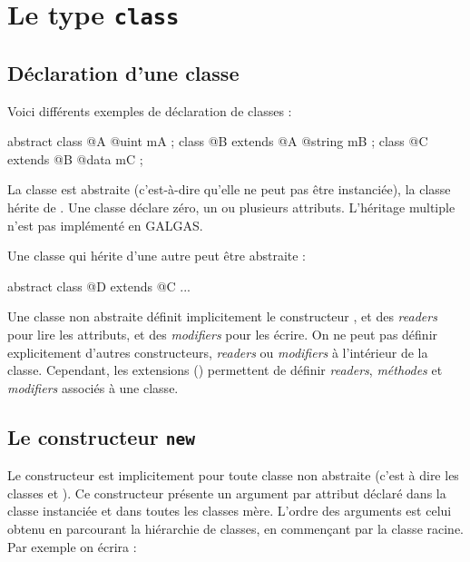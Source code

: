 
\chapter{Le type \texttt{class}}

\section{Déclaration d'une classe}

Voici différents exemples de déclaration de classes :

\begin{galgascode}
abstract class @A {
  @uint mA ;
}
class @B extends @A {
  @string mB ;
}
class @C extends @B {
  @data mC ;
}
\end{galgascode}

La classe  est abstraite (c'est-à-dire qu'elle ne peut pas être instanciée), la classe  hérite de . Une classe déclare zéro, un ou plusieurs attributs. L'héritage multiple n'est pas implémenté en GALGAS.

Une classe qui hérite d'une autre peut être abstraite :
\begin{galgascode}
abstract class @D extends @C {
  ...
 }
\end{galgascode}

Une classe non abstraite définit implicitement le constructeur , et des \emph{readers} pour lire les attributs, et des \emph{modifiers} pour les écrire. On ne peut pas définir explicitement d'autres constructeurs, \emph{readers} ou \emph{modifiers} à l'intérieur de la classe. Cependant,  les extensions () permettent de définir \emph{readers}, \emph{méthodes} et \emph{modifiers} associés à une classe.












\section{Le constructeur \texttt{new}}

Le constructeur  est implicitement pour toute classe non abstraite (c'est à dire les classes  et ). Ce constructeur présente un argument par attribut déclaré dans la classe instanciée et dans toutes les classes mère. L'ordre des arguments est celui obtenu en parcourant la hiérarchie de classes, en commençant par la classe racine. Par exemple on écrira :

